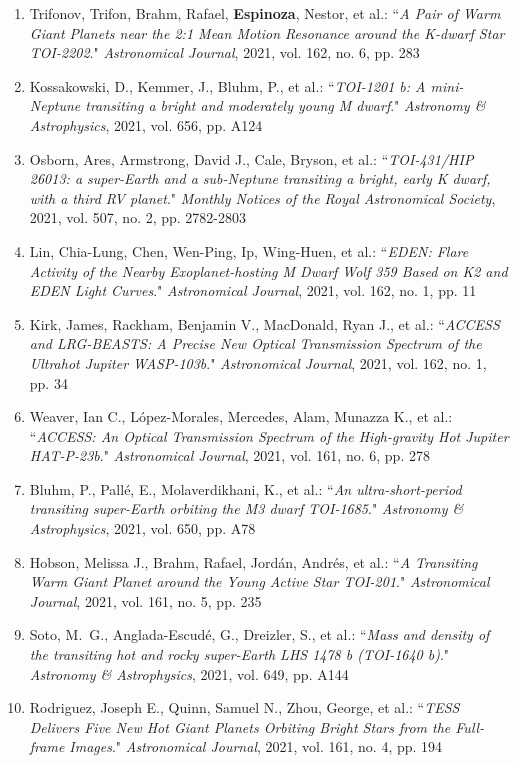 \documentclass[12pt, a4paper]{article} %
\begin{document}
\begin{flushleft}
\begin{enumerate}
\item Trifonov, Trifon, Brahm, Rafael, \textbf{Espinoza}, Nestor, et al.: ``\textit{A Pair of Warm Giant Planets near the 2:1 Mean Motion Resonance around the K-dwarf Star TOI-2202}." \textit{Astronomical Journal}, 2021, vol. 162, no. 6, pp. 283
\item Kossakowski, D., Kemmer, J., Bluhm, P., et al.: ``\textit{TOI-1201 b: A mini-Neptune transiting a bright and moderately young M dwarf}." \textit{Astronomy \& Astrophysics}, 2021, vol. 656, pp. A124
\item Osborn, Ares, Armstrong, David J., Cale, Bryson, et al.: ``\textit{TOI-431/HIP 26013: a super-Earth and a sub-Neptune transiting a bright, early K dwarf, with a third RV planet}." \textit{Monthly Notices of the Royal Astronomical Society}, 2021, vol. 507, no. 2, pp. 2782-2803
\item Lin, Chia-Lung, Chen, Wen-Ping, Ip, Wing-Huen, et al.: ``\textit{EDEN: Flare Activity of the Nearby Exoplanet-hosting M Dwarf Wolf 359 Based on K2 and EDEN Light Curves}." \textit{Astronomical Journal}, 2021, vol. 162, no. 1, pp. 11
\item Kirk, James, Rackham, Benjamin V., MacDonald, Ryan J., et al.: ``\textit{ACCESS and LRG-BEASTS: A Precise New Optical Transmission Spectrum of the Ultrahot Jupiter WASP-103b}." \textit{Astronomical Journal}, 2021, vol. 162, no. 1, pp. 34
\item Weaver, Ian C., López-Morales, Mercedes, Alam, Munazza K., et al.: ``\textit{ACCESS: An Optical Transmission Spectrum of the High-gravity Hot Jupiter HAT-P-23b}." \textit{Astronomical Journal}, 2021, vol. 161, no. 6, pp. 278
\item Bluhm, P., Pallé, E., Molaverdikhani, K., et al.: ``\textit{An ultra-short-period transiting super-Earth orbiting the M3 dwarf TOI-1685}." \textit{Astronomy \& Astrophysics}, 2021, vol. 650, pp. A78
\item Hobson, Melissa J., Brahm, Rafael, Jordán, Andrés, et al.: ``\textit{A Transiting Warm Giant Planet around the Young Active Star TOI-201}." \textit{Astronomical Journal}, 2021, vol. 161, no. 5, pp. 235
\item Soto, M.~G., Anglada-Escudé, G., Dreizler, S., et al.: ``\textit{Mass and density of the transiting hot and rocky super-Earth LHS 1478 b (TOI-1640 b)}." \textit{Astronomy \& Astrophysics}, 2021, vol. 649, pp. A144
\item Rodriguez, Joseph E., Quinn, Samuel N., Zhou, George, et al.: ``\textit{TESS Delivers Five New Hot Giant Planets Orbiting Bright Stars from the Full-frame Images}." \textit{Astronomical Journal}, 2021, vol. 161, no. 4, pp. 194

\end{enumerate}
\end{flushleft}
\end{document}
